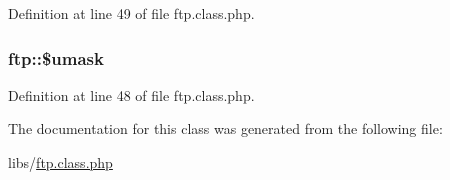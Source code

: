 Definition at line 49 of file ftp.\+class.\+php.

\subsubsection[{\texorpdfstring{\$umask}{$umask}}]{\setlength{\rightskip}{0pt plus 5cm}ftp\+::\$umask}\hypertarget{classftp_a40322387fc5aa5074daf7aaa4b7aa742}{}\label{classftp_a40322387fc5aa5074daf7aaa4b7aa742}


Definition at line 48 of file ftp.\+class.\+php.



The documentation for this class was generated from the following file\+:\begin{DoxyCompactItemize}
\item 
libs/\hyperlink{ftp_8class_8php}{ftp.\+class.\+php}\end{DoxyCompactItemize}
